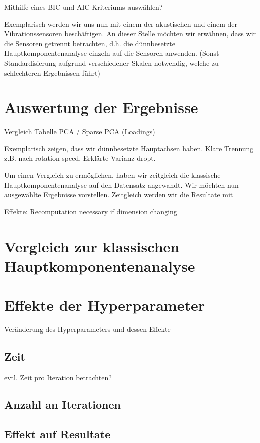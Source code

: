 Mithilfe eines BIC und AIC Kriteriums auswählen?

Exemplarisch werden wir uns nun mit einem der akustischen und einem der Vibrationssensoren beschäftigen. An dieser Stelle möchten wir erwähnen, dass wir die Sensoren getrennt betrachten, d.h. die dünnbesetzte Hauptkomponentenanalyse einzeln auf die Sensoren anwenden.
(Sonst Standardisierung aufgrund verschiedener Skalen notwendig, welche zu schlechteren Ergebnissen führt)




\section{Auswertung der Ergebnisse}
\label{evaluation}

Vergleich Tabelle PCA / Sparse PCA (Loadings)

Exemplarisch zeigen, dass wir dünnbesetzte Hauptachsen haben. Klare Trennung z.B. nach rotation speed. Erklärte Varianz dropt.

Um einen Vergleich zu ermöglichen, haben wir zeitgleich die klassische Hauptkomponentenanalyse auf den Datensatz angewandt.
Wir möchten nun ausgewählte Ergebnisse vorstellen. Zeitgleich werden wir die Resultate mit 



Effekte: Recomputation necessary if dimension changing





\section{Vergleich zur klassischen Hauptkomponentenanalyse}
\label{comparison}




\section{Effekte der Hyperparameter}
\label{parameter_effects}
Veränderung des Hyperparameters und dessen Effekte
\subsection{Zeit}
evtl. Zeit pro Iteration betrachten?
\subsection{Anzahl an Iterationen}
\subsection{Effekt auf Resultate}
